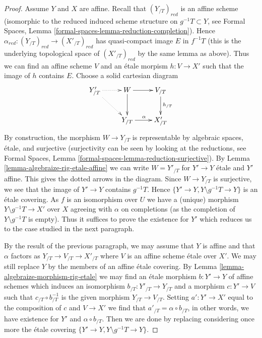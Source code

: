 \documentclass[10pt,a4paper]{amsart}
\theoremstyle{plain}
\theoremstyle{definition}
\theoremstyle{remark}
\numberwithin{equation}{subsection}
\begin{document}
\begin{proof}
\medskip\noindent
Assume $Y$ and $X$ are affine. Recall that $(Y_{/T})_{red}$
is an affine scheme (isomorphic to the reduced induced scheme structure
on $g^{-1}T \subset Y$, see Formal Spaces, Lemma
\ref{formal-spaces-lemma-reduction-completion}).
Hence $\alpha_{red} : (Y_{/T})_{red} \to (X'_{/T})_{red}$
has quasi-compact image $E$ in $f^{-1}T$ (this is the underlying
topological space of $(X'_{/T})_{red}$ by the same lemma as above).
Thus we can find an affine scheme $V$ and an \'etale morpism
$h : V \to X'$ such that the image of $h$ contains $E$.
Choose a solid cartesian diagram
$$
\xymatrix{
Y'_{/T} \ar@{..>}[rd] \ar@{..>}[r] &
W \ar[d] \ar[r] & V_{/T} \ar[d]^{h_{/T}} \\
& Y_{/T} \ar[r]^\alpha & X'_{/T}
}
$$
By construction, the morphism $W \to Y_{/T}$ is representable by
algebraic spaces, \'etale, and surjective
(surjectivity can be seen by looking at the reductions, see
Formal Spaces, Lemma
\ref{formal-spaces-lemma-reduction-surjective}).
By Lemma \ref{lemma-algebraize-rig-etale-affine}
we can write $W = Y'_{/T}$ for $Y' \to Y$ \'etale and $Y'$ affine.
This gives the dotted arrows in the diagram.
Since $W \to Y_{/T}$ is surjective, we see that
the image of $Y' \to Y$ contains $g^{-1}T$.
Hence $\{Y' \to Y, Y \setminus g^{-1}T \to Y\}$
is an \'etale covering. As $f$ is an isomorphism over $U$ we have a
(unique) morphism $Y \setminus g^{-1}T \to X'$ over $X$
agreeing with $\alpha$ on completions
(as the completion of $Y \setminus g^{-1}T$ is empty).
Thus it suffices to prove the existence for $Y'$
which reduces us to the case studied in the next paragraph.

\medskip\noindent
By the result of the previous paragraph, we may assume that $Y$ is affine
and that $\alpha$ factors as $Y_{/T} \to V_{/T} \to X'_{/T}$
where $V$ is an affine scheme \'etale over $X'$. We may still replace $Y$ by
the members of an affine \'etale covering.
By Lemma \ref{lemma-algebraize-morphism-rig-etale}
we may find an \'etale morphism $b : Y' \to Y$ of affine schemes
which induces an isomorphism $b_{/T} : Y'_{/T} \to Y_{/T}$
and a morphism $c : Y' \to V$ such that $c_{/T} \circ b_{/T}^{-1}$
is the given morphism $Y_{/T} \to V_{/T}$. Setting
$a' : Y' \to X'$ equal to the composition of $c$ and $V \to X'$
we find that $a'_{/T} = \alpha \circ b_{/T}$, in other words, we have
existence for $Y'$ and $\alpha \circ b_{/T}$.
Then we are done by replacing considering once more
the \'etale covering $\{Y' \to Y, Y \setminus g^{-1}T \to Y\}$.
\end{proof}
\end{document}
